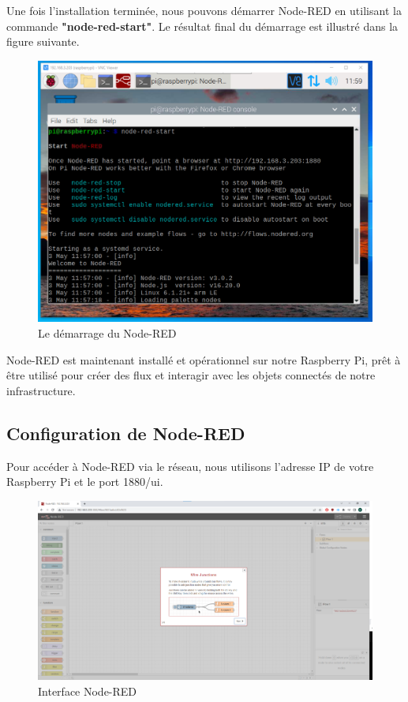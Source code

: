 Une fois l'installation terminée, nous pouvons démarrer Node-RED en utilisant la commande \textbf{"node-red-start"}. Le résultat final du démarrage est illustré dans la figure suivante. \\


\begin{figure}[H]
 \centering
    \includegraphics[width=15cm]{Images/NodeRedStart1.png}
    \caption{Le démarrage du Node-RED}
    \label{Chap4.3.5}
\end{figure}    
\smallskip


Node-RED est maintenant installé et opérationnel sur notre Raspberry Pi, prêt à être utilisé pour créer des flux et interagir avec les objets connectés de notre infrastructure. \\



\subsection{Configuration de Node-RED}

Pour accéder à Node-RED via le réseau, nous utilisons l'adresse IP de votre Raspberry Pi et le port 1880/ui.

\begin{figure}[H]
\centering
\includegraphics[width=15cm]{Images/NodeRedInterface.png}
\caption{Interface Node-RED}
\label{Chap4.3.6}
\end{figure}

